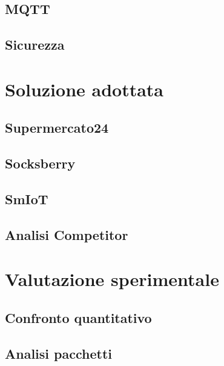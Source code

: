 \documentclass[a4paper, 12pt] {report}
\begin{document}
      \section{MQTT}
        \label{sec:mqtt}
        
      \section{Sicurezza}
        \label{sec:security}
        

  \newpage
  \thispagestyle{empty}
  \mbox{}

  \chapter{Soluzione adottata}
    \label{ch:solution}
    
      \section{Supermercato24}
        \label{sec:supermercato24}
        
      \section{Socksberry}
        \label{sec:socksberry}
        
      \section{SmIoT}
        \label{sec:smiot}
        
      \section{Analisi Competitor}
        \label{sec:competitor}
        

  \newpage
  \thispagestyle{empty}
  \mbox{}

  \chapter{Valutazione sperimentale}
    \label{ch:evaluation}
    
      \section{Confronto quantitativo}
        \label{sec:comparison}
        
      \section{Analisi pacchetti}
        \label{sec:packet}
        
\end{document}

